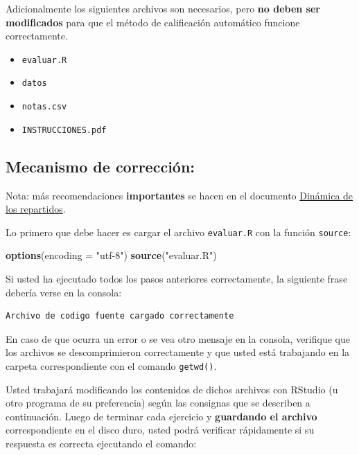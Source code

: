 \documentclass[]{article}
\newenvironment{Shaded}{}{}
\newcommand{\KeywordTok}[1]{\textcolor[rgb]{0.00,0.44,0.13}{\textbf{{#1}}}}
\newcommand{\DataTypeTok}[1]{\textcolor[rgb]{0.56,0.13,0.00}{{#1}}}
\newcommand{\StringTok}[1]{\textcolor[rgb]{0.25,0.44,0.63}{{#1}}}
\newcommand{\NormalTok}[1]{{#1}}
\begin{document}
Adicionalmente los siguientes archivos son necesarios, pero \textbf{no
deben ser modificados} para que el método de calificación automático
funcione correctamente.

\begin{itemize}
\item
  \texttt{evaluar.R}
\item
  \texttt{datos}
\item
  \texttt{notas.csv}
\item
  \texttt{INSTRUCCIONES.pdf}
\end{itemize}
\subsection{Mecanismo de corrección:}

Nota: más recomendaciones \textbf{importantes} se hacen en el documento
\href{http://goo.gl/P5Wnq}{Dinámica de los repartidos}.

Lo primero que debe hacer es cargar el archivo \texttt{evaluar.R} con la
función \texttt{source}:

\begin{Shaded}
\begin{Highlighting}[]
\KeywordTok{options}\NormalTok{(}\DataTypeTok{encoding =} \StringTok{"utf-8"}\NormalTok{)}
\KeywordTok{source}\NormalTok{(}\StringTok{"evaluar.R"}\NormalTok{)}
\end{Highlighting}
\end{Shaded}
Si usted ha ejecutado todos los pasos anteriores correctamente, la
siguiente frase debería verse en la consola:

\begin{verbatim}
Archivo de codigo fuente cargado correctamente
\end{verbatim}
En caso de que ocurra un error o se vea otro mensaje en la consola,
verifique que los archivos se descomprimieron correctamente y que usted
está trabajando en la carpeta correspondiente con el comando
\texttt{getwd()}.

Usted trabajará modificando los contenidos de dichos archivos con
RStudio (u otro programa de su preferencia) según las consignas que se
describen a continuación. Luego de terminar cada ejercicio y
\textbf{guardando el archivo} correspondiente en el disco duro, usted
podrá verificar rápidamente si su respuesta es correcta ejecutando el
comando:
\end{document}
